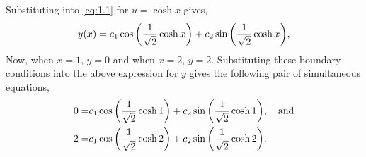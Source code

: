 \def\osx[#1]{{\L\frac{1}{\sqrt{2}}\cosh {#1}\R}}%
Substituting into \eqref{eq:1.1} for $u=\cosh x$ gives,
\begin{equation}
\label{eq:1.2}
	y(x) = c_1\cos\osx[x] + c_2\sin\osx[x],
\end{equation}
Now, when $x=1$, $y=0$ and when $x=2$, $y=2$. Substituting  these boundary conditions into the above expression for $y$ gives the following pair of simultaneous equations,
\begin{align*}
	0 =& c_1\cos\osx[1] + c_2\sin\osx[1],\quad\textrm{and}\\
	2 =& c_1\cos\osx[2] + c_2\sin\osx[2].
\end{align*}